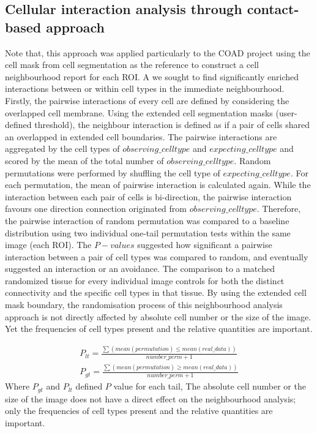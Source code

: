 \subsection{Cellular interaction analysis through contact-based approach}
Note that, this approach was applied particularly to the COAD project using the cell mask from cell segmentation as the reference to construct a cell neighbourhood report for each ROI. A we sought to find significantly enriched interactions between or within cell types in the immediate neighbourhood. Firstly, the pairwise interactions of every cell are defined by considering the overlapped cell membrane. Using the extended cell segmentation masks (user-defined threshold), the neighbour interaction is defined as if a pair of cells shared an overlapped in extended cell boundaries. The pairwise interactions are aggregated by the cell types of $observing\_celltype$ and $expecting\_celltype$ and scored by the mean of the total number of $observing\_celltype$. Random permutations were performed by shuffling the cell type of $expecting\_celltype$. For each permutation, the mean of pairwise interaction is calculated again. While the interaction between each pair of cells is bi-direction, the pairwise interaction favours one direction connection originated from $observing\_celltype$. Therefore, the pairwise interaction of random permutation was compared to a baseline distribution using two individual one-tail permutation tests within the same image (each ROI). The $P-values$ suggested how significant a pairwise interaction between a pair of cell types was compared to random, and eventually suggested an interaction or an avoidance. The comparison to a matched randomized tissue for every individual image controls for both the distinct connectivity and the specific cell types in that tissue. By using the extended cell mask boundary, the randomisation process of this neighbourhood analysis approach is not directly affected by absolute cell number or the size of the image. Yet the frequencies of cell types present and the relative quantities are important.

\begin{equation}
\begin{split}
P_{lt} = \frac{ \sum(mean(permutation) \leq mean(real\_data) )}{number\_perm + 1} \\
P_{gt} = \frac{\sum(mean(permutation) \geq mean(real\_data) )}{number\_perm + 1}
\label{chap1:eq:02}
\end{split}
\end{equation}
Where $P_{gt}$ and $P_{lt}$ defined $P$ value for each tail, 
The absolute cell number or the size of the image does not have a direct effect on the neighbourhood analysis; only the frequencies of cell types present and the relative quantities are important. 


